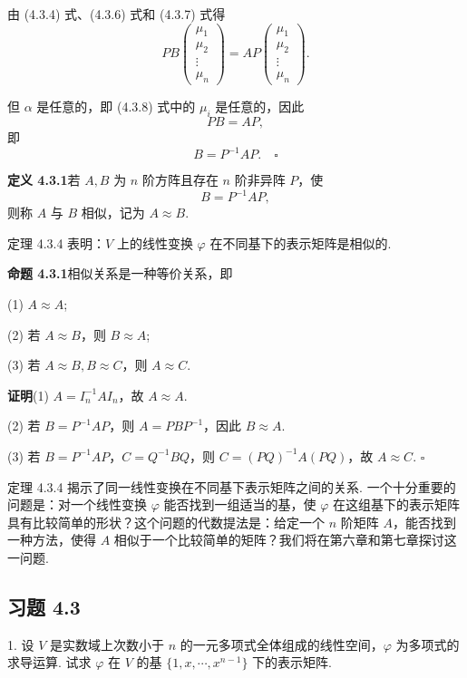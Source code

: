 \documentclass[UTF8, 12pt, fontset=fandol, oneside]{ctexart}
\begin{document}
由 (4.3.4) 式、(4.3.6) 式和 (4.3.7) 式得
\begin{equation}
PB
\left(\begin{array}{c}
\mu_1\\
\mu_2\\
\vdots\\
\mu_n
\end{array}\right)
=AP
\left(\begin{array}{c}
\mu_1\\
\mu_2\\
\vdots\\
\mu_n
\end{array}\right).
\tag{4.3.8}
\end{equation}

但 $\alpha$ 是任意的，即 (4.3.8) 式中的 $\mu_i$ 是任意的，因此
\[
PB=AP,
\]
即
\[
B=P^{-1}AP. \quad \square
\]

\noindent\textbf{定义 4.3.1}\quad 若 $A,B$ 为 $n$ 阶方阵且存在 $n$ 阶非异阵 $P$，使
\[
B=P^{-1}AP,
\]
则称 $A$ 与 $B$ 相似，记为 $A\approx B$.

定理 4.3.4 表明：$V$ 上的线性变换 $\varphi$ 在不同基下的表示矩阵是相似的.

\noindent\textbf{命题 4.3.1}\quad 相似关系是一种等价关系，即

(1) $A\approx A$;

(2) 若 $A\approx B$，则 $B\approx A$;

(3) 若 $A\approx B,B\approx C$，则 $A\approx C$.

\noindent\textbf{证明}\quad (1) $A=I_n^{-1}AI_n$，故 $A\approx A$.

(2) 若 $B=P^{-1}AP$，则 $A=PBP^{-1}$，因此 $B\approx A$.

(3) 若 $B=P^{-1}AP$，$C=Q^{-1}BQ$，则 $C=(PQ)^{-1}A(PQ)$，故 $A\approx C$. $\square$

定理 4.3.4 揭示了同一线性变换在不同基下表示矩阵之间的关系. 一个十分重要的问题是：对一个线性变换 $\varphi$ 能否找到一组适当的基，使 $\varphi$ 在这组基下的表示矩阵具有比较简单的形状？这个问题的代数提法是：给定一个 $n$ 阶矩阵 $A$，能否找到一种方法，使得 $A$ 相似于一个比较简单的矩阵？我们将在第六章和第七章探讨这一问题.

\subsection*{习题 4.3}

1. 设 $V$ 是实数域上次数小于 $n$ 的一元多项式全体组成的线性空间，$\varphi$ 为多项式的求导运算. 试求 $\varphi$ 在 $V$ 的基 $\{1,x,\cdots,x^{n-1}\}$ 下的表示矩阵.
\end{document}

